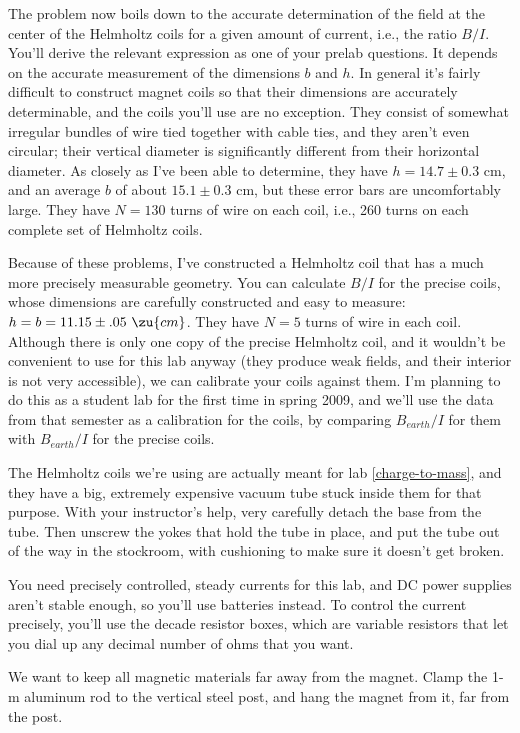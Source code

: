 The problem now boils down to the accurate determination of the field at the center of the Helmholtz coils
for a given amount of current, i.e., the ratio $B/I$. You'll derive the relevant expression as one of your prelab questions.
It depends on the accurate measurement of the dimensions $b$ and $h$. In general it's fairly difficult to
construct magnet coils so that their dimensions are accurately determinable, and the coils you'll use are no
exception. They consist of somewhat irregular bundles of wire tied together with cable ties, and they
aren't even circular; their vertical diameter is significantly different from their horizontal diameter.
As closely as I've been able to determine, they have $h=14.7\pm0.3$ cm, and an average $b$ of about $15.1\pm0.3$ cm,
but these error bars are uncomfortably large. They have $N=130$ turns of wire on each coil, i.e., 260 turns
on each complete set of Helmholtz coils.

Because of these problems, I've constructed a Helm\-holtz coil that has a much more precisely
measurable geometry. You can calculate $B/I$ for the precise coils, whose dimensions are
carefully constructed and easy to measure: $h=b=11.15\pm.05\ \zu{cm}$. They have $N=5$ turns of wire
in each coil.
Although there is only one copy of the precise Helmholtz coil, and it wouldn't
be convenient to use for this lab anyway (they produce weak fields, and their interior is not very
accessible), we can calibrate your coils against them. I'm planning to do this as a student lab for
the first time in spring 2009, and we'll use the data from that semester as a calibration for the coils,
by comparing $B_{earth}/I$ for them with  $B_{earth}/I$ for the precise coils.

The Helmholtz coils we're using are actually meant for lab \ref{charge-to-mass}, and they have a big,
extremely expensive vacuum tube stuck inside them for that purpose. With your instructor's help,
very carefully detach the base from the tube. Then unscrew the yokes that hold the tube in place, and
put the tube out of the way in the stockroom, with cushioning to make sure it doesn't get broken.

You need precisely controlled, steady currents for this lab, and DC power supplies aren't stable enough,
so you'll use batteries instead. To control the current precisely, you'll use the decade resistor
boxes, which are variable resistors that let you dial up any decimal number of ohms that you want.

We want to keep all magnetic materials far away from the magnet.
Clamp the 1-m aluminum rod to the vertical steel post, and hang the magnet from it, far from the post.

